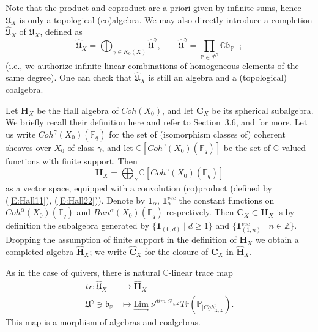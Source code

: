 \documentclass[a4paper,10pt]{amsart}
\def\Z{\mathbb{Z}}
\def\a{\alpha}
\def\C{\mathbb{C}}
\def\fq{\mathbb{F}_q}
\def\bo{\mathfrak{b}}
\numberwithin{equation}{section}
\begin{document}
\vspace{.1in}

Note that the product and coproduct are a priori given by infinite sums, hence $\mathfrak{U}_X$ is only a topological (co)algebra. We may also directly introduce a completion $\widehat{\mathfrak{U}}_X$ of $\mathfrak{U}_X$, defined as
$$\widehat{\mathfrak{U}}_{X}=\bigoplus_{\gamma \in K_0(X)} \widehat{\mathfrak{U}}^{\gamma}, \qquad 
\widehat{\mathfrak{U}}^{\gamma}=\prod_{\mathbb{P} \in \mathcal{P}^{\gamma}} \C \bo_{\mathbb{P}}\;\;;$$
(i.e., we authorize infinite linear combinations of homogeneous elements of the same degree). One can check that  $\widehat{\mathfrak{U}}_{X}$ is still an algebra and a (topological) coalgebra.

\vspace{.1in}

Let $\mathbf{H}_X$ be the Hall algebra of $Coh(X_0)$, and let $\mathbf{C}_X$ be its spherical subalgebra. We briefly recall their definition here and refer to Section~3.6, and \cite[Lecture~4]{Trieste} for more. 
Let us write $Coh^{\gamma}(X_0)(\fq)$ for the set of (isomorphism classes of) coherent sheaves over $X_0$ of class $\gamma$, and let $\C
[Coh^{\gamma}(X_0)(\fq)]$ be the set of $\C$-valued functions with finite support. Then $$\mathbf{H}_X =\bigoplus_{\gamma} \C[Coh^{\gamma}(X_0)(\fq)]$$
as a vector space, equipped with a convolution (co)product (defined by (\ref{E:Hall11}), (\ref{E:Hall22})).
Denote by $\mathbf{1}_{\a}$, $\mathbf{1}^{vec}_{\a}$ the constant functions on $Coh^{\a}(X_0)(\fq)$ and $Bun^{\a}(X_0)(\fq)$ respectively. Then $\mathbf{C}_X \subset \mathbf{H}_X$ is by definition the subalgebra generated by $\{\mathbf{1}_{(0,d)}\;|\; d \geq 1\}$ and $\{\mathbf{1}^{vec}_{(1,n)}\;|\; n \in \Z\}$. Dropping the assumption of finite support in the definition of $\mathbf{H}_X$ we obtain a completed algebra $\widehat{\mathbf{H}}_X$; we write $\widehat{\mathbf{C}}_X$ for the closure of $\mathbf{C}_X$ in $\widehat{\mathbf{H}}_X$.

\vspace{.1in}

As in the case of quivers, there is natural $\C$-linear trace map 
\begin{align*}
tr: \widehat{\mathfrak{U}}_X &\to \widehat{\mathbf{H}}_X\\
\mathfrak{U}^{\gamma} \ni \bo_{\mathbb{P}} &\mapsto \underset{\longrightarrow}{\text{Lim}} \;\nu^{dim\; G_{\gamma,\mathcal{L}}} Tr(\mathbb{P}_{|\underline{Coh}^{\gamma}_{X,\mathcal{L}}}).
\end{align*}
This map is a morphism of algebras and coalgebras.
\end{document}
